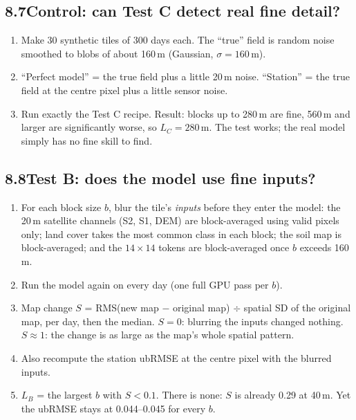 \documentclass[11pt,a4paper]{article}
\begin{document}
\subsection*{8.7\quad Control: can Test C detect real fine detail?}
\begin{enumerate}
\item Make 30 synthetic tiles of 300 days each. The ``true'' field is random noise smoothed to blobs of about 160\,m (Gaussian, $\sigma = 160$\,m).
\item ``Perfect model'' = the true field plus a little 20\,m noise. ``Station'' = the true field at the centre pixel plus a little sensor noise.
\item Run exactly the Test C recipe. Result: blocks up to 280\,m are fine, 560\,m and larger are significantly worse, so $L_C = 280$\,m.
      The test works; the real model simply has no fine skill to find.
\end{enumerate}

\subsection*{8.8\quad Test B: does the model use fine inputs?}
\begin{enumerate}
\item For each block size $b$, blur the tile's \emph{inputs} before they enter the model:
      the 20\,m satellite channels (S2, S1, DEM) are block-averaged using valid pixels only; land cover takes the most common class in each block;
      the soil map is block-averaged; and the $14 \times 14$ tokens are block-averaged once $b$ exceeds 160\,m.
\item Run the model again on every day (one full GPU pass per $b$).
\item Map change $S$ = RMS(new map $-$ original map) $\div$ spatial SD of the original map, per day, then the median.
      $S = 0$: blurring the inputs changed nothing. $S \approx 1$: the change is as large as the map's whole spatial pattern.
\item Also recompute the station ubRMSE at the centre pixel with the blurred inputs.
\item $L_B$ = the largest $b$ with $S < 0.1$. There is none: $S$ is already 0.29 at 40\,m. Yet the ubRMSE stays at 0.044--0.045 for every $b$.
\end{enumerate}
\end{document}
